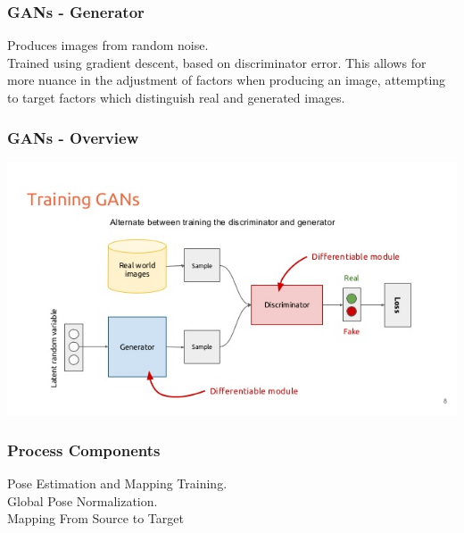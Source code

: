 \documentclass{beamer}
\begin{document}
     \begin{frame}
        \frametitle{GANs - Generator}
        Produces images from random noise. \\
        \vspace{0.2in}
        Trained using gradient descent, based on discriminator error. This allows for more nuance in the adjustment of factors when producing an image, attempting to target factors which distinguish real and generated images.\\
    \end{frame}

    \begin{frame}
        \frametitle{GANs - Overview}
        \includegraphics[scale=.5]{images/GANs.jpg}
    \end{frame}

    \begin{frame}
        \frametitle{Process Components}
        Pose Estimation and Mapping Training. \\
        \vspace{0.2in}
        Global Pose Normalization.\\
        \vspace{0.2in}
        Mapping From Source to Target
    \end{frame}
\end{document}
